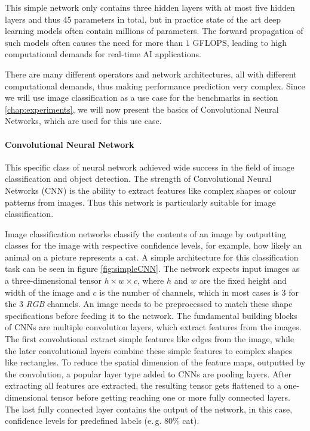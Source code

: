 This simple network only contains three hidden layers with at most five hidden layers and thus 45 parameters in total, but in practice state of the art deep learning models often contain millions of parameters. 
The forward propagation of such models often causes the need for more than $1$ GFLOPS, leading to high computational demands for real-time AI applications.


There are many different operators and network architectures, all with different computational demands, thus making performance prediction very complex.
Since we will use image classification as a use case for the benchmarks in section \ref{chap:experiments}, we will now present the basics of Convolutional Neural Networks, which are used for this use case.

\paragraph{Convolutional Neural Network}
This specific class of neural network achieved wide success in the field of image classification and object detection.
The strength of Convolutional Neural Networks (CNN) is the ability to extract features like complex shapes or colour patterns from images. Thus this network is particularly suitable for image classification.

Image classification networks classify the contents of an image by outputting classes for the image with respective confidence levels, for example, how likely an animal on a picture represents a cat.
A simple architecture for this classification task can be seen in figure \ref{fig:simpleCNN}.
The network expects input images as a three-dimensional tensor $h\times w\times c$, where $h$ and $w$ are the fixed height and width of the image and $c$ is the number of channels, which in most cases is $3$ for the $3$ \emph{RGB} channels.
An image needs to be preprocessed to match these shape specifications before feeding it to the network.
The fundamental building blocks of CNNs are multiple convolution layers, which extract features from the images. The first convolutional extract simple features like edges from the image, while the later convolutional layers combine these simple features to complex shapes like rectangles.
To reduce the spatial dimension of the feature maps, outputted by the convolution, a popular layer type added to CNNs are pooling layers.
After extracting all features are extracted, the resulting tensor gets flattened to a one-dimensional tensor before getting reaching one or more fully connected layers.
The last fully connected layer contains the output of the network, in this case, confidence levels for predefined labels (e.\,g. $80$\% cat).  


